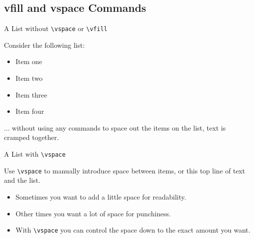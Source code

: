 
\subsection{vfill and vspace Commands}

\begin{frame}{A List without \texttt{\textbackslash vspace} or \texttt{\textbackslash vfill}}

Consider the following list:

\begin{itemize}

\item Item one

\item Item two 

\item Item three 

\item Item four
\end{itemize} 

... without using any commands to space out the items on the list, text is cramped together.

\end{frame}

\begin{frame}{A List with \texttt{\textbackslash vspace}}

Use \texttt{\textbackslash vspace} to manually introduce space between items, or this top line of text and the list.

\vspace{1em}

\begin{itemize}

\item Sometimes you want to add a little space for readability.

\vspace{3em} \pause

\item Other times you want a lot of space for punchiness.

\vspace{3em} \pause

\item With \texttt{\textbackslash vspace} you can control the space down to the exact amount you want.

\vspace{1em}
\end{itemize} 

\end{frame}

